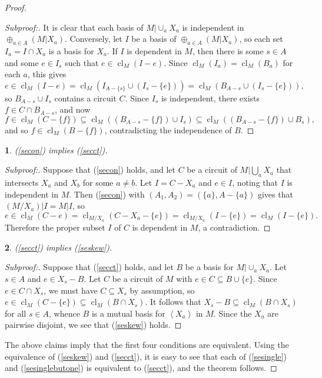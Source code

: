 \documentclass{amsart}
\theoremstyle{plain}
\newtheorem{claim}{}[theorem]
\theoremstyle{definition}
\DeclareMathOperator{\cl}{cl}
\newcommand{\con}{/}
\newcommand{\br}[1]{\left(#1\right)}
\newcommand{\ab}[1]{\left\langle#1\right\rangle}
\renewcommand{\ss}{\subseteq}
\newenvironment{subproof}[1][\proofname]{%
  \renewcommand{\qedsymbol}{$\blacksquare$}%
  \begin{proof}[Subproof:]%
}{%
  \end{proof}%
}
\begin{document}
\begin{proof}
\begin{subproof}
  It is clear that each basis of $M | \cup_a X_a$ is independent in 
  $\oplus_{a \in A}(M | X_a)$. Conversely, let $I$ be a basis of 
  $\oplus_{a \in A}(M | X_a)$, so each set $I_a = I \cap X_a$ is a basis for $X_a$. 
  If $I$ is dependent in $M$, then there is some $s \in A$ and some $e \in I_s$ such that 
  $e \in \cl_M(I - e)$. Since $\cl_M(I_a) = \cl_M(B_a)$ for each $a$, this gives
  \[e \in \cl_M(I-e) = \cl_M\br{I_{A-\{s\}} \cup (I_s - \{e\})}
  = \cl_M\br{B_{A-s} \cup (I_s - \{e\})},\]
  so $B_{A-s} \cup I_s$ contains a circuit $C$. Since $I_s$ is independent, there
  exists $f \in C \cap B_{A-s}$, 
  and now 
  \[f \in \cl_M(C-\{f\}) \ss \cl_M((B_{A-s} - \{f\}) \cup I_s) \ss 
  \cl_M\br{(B_{A-s} - \{f\}) \cup B_s},\]
  and so $f \in \cl_M(B-\{f\})$, contradicting the independence of $B$. 
  \end{subproof}
  \begin{claim}(\ref{secon}) implies (\ref{secct}). \end{claim}
  \begin{subproof}
    Suppose that (\ref{secon}) holds, and let $C$ be a circuit of $M | \bigcup_a X_a$
    that intersects $X_a$ and $X_b$ for some $a \ne b$. Let $I = C - X_a$ and $e \in I$, 
    noting that $I$ is independent in $M$. 
    Then (\ref{secon}) with $(A_1,A_2) = (\{a\},A - \{a\})$ gives that 
    $(M \con X_a) | I = M | I$, so
    \[e \in \cl_M(C-e) = \cl_{M \con X_a}(C- X_a - \{e\}) = \cl_{M \con X_a}(I-\{e\}) = \cl_M(I-\{e\}).\]
    Therefore the proper subset $I$ of $C$ is dependent in $M$, a contradiction.
  \end{subproof}
  \begin{claim}(\ref{secct}) implies (\ref{seskew}).
  \end{claim}
  \begin{subproof}
    Suppose that (\ref{secct}) holds, and let $B$ be a basis for $M | \cup_a X_a$.
    Let $s \in A$ and $e \in X_s - B$. Let $C$ be a circuit of $M$ with $e \in C \ss B \cup \{e\}$.  Since $e \in C \cap X_s$, we must have $C \ss X_s$ by assumption, 
    so $e \in \cl_M(C - \{e\}) \ss \cl_M(B \cap X_s)$. 
    It follows that $X_s - B \ss \cl_M(B \cap X_s)$ for all $s \in A$, 
    whence $B$ is a mutual basis for $\ab{X_a}$ in $M$. 
    Since the $X_a$ are pairwise disjoint, we see that (\ref{seskew}) holds. 
  \end{subproof}
  
  The above claims imply that the first four conditions are equivalent.
  Using the equivalence of (\ref{seskew}) and (\ref{secct}), 
  it is easy to see that each of (\ref{sesingle}) and (\ref{sesinglebutone})
  is equivalent to (\ref{secct}), and the theorem follows. 
\end{proof}
\end{document}
